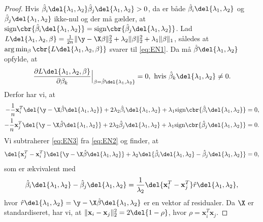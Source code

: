 \begin{proof}
Hvis \(\hat{\beta}_i \del{\lambda_1, \lambda_2} \hat{\beta}_j \del{\lambda_1, \lambda_2} > 0\), da er både \(\hat{\beta}_i \del{\lambda_1, \lambda_2}\) og \(\hat{\beta}_j \del{\lambda_1, \lambda_2}\) ikke-nul og der må gælder, at \(\text{sign} \cbr{\hat{\beta}_i \del{\lambda_1, \lambda_2}} = \text{sign} \cbr{\hat{\beta}_j \del{\lambda_1, \lambda_2}}\).
Lad \(L \del{\lambda_1,\lambda_2, \beta} = \frac{1}{2n} \Vert \y - \X \beta \Vert_2^2 + \lambda_2 \Vert \beta \Vert_2^2 + \lambda_1 \Vert \beta \Vert_1\), således at  \(\arg \min_{\beta} \cbr{L \del{\lambda_1,\lambda_2, \beta}}\) svarer til \eqref{eq:EN1}.
Da må \(\hat{\beta} \del{\lambda_1, \lambda_2}\) opfylde, at
\begin{align*}
\frac{\partial L \del{\lambda_1,\lambda_2, \beta} }{\partial \beta_k} \Bigr|_{\beta = \hat{\beta} \del{\lambda_1, \lambda_2}}=0, \text{ hvis } \hat{\beta}_k \del{\lambda_1, \lambda_2} \neq 0.
\end{align*}
Derfor har vi, at
\begin{align}
-\frac{1}{n} \mathbf{x}_i^T \del{\y - \X \hat{\beta} \del{\lambda_1, \lambda_2}} +  2 \lambda_2 \hat{\beta}_i \del{\lambda_1, \lambda_2} + \lambda_1 \text{sign} \cbr{\hat{\beta}_i \del{\lambda_1, \lambda_2}} &= 0, \label{eq:EN2}\\
-\frac{1}{n} \mathbf{x}_j^T \del{\y - \X \hat{\beta} \del{\lambda_1, \lambda_2}} + 2 \lambda_2 \hat{\beta}_j \del{\lambda_1, \lambda_2} + \lambda_1 \text{sign} \cbr{\hat{\beta}_j \del{\lambda_1, \lambda_2}} &= 0. \label{eq:EN3}
\end{align}
Vi subtraherer \eqref{eq:EN3} fra \eqref{eq:EN2} og finder, at
\begin{align*}
\del{\mathbf{x}_j^T-\mathbf{x}_i^T} \del{\y - \X \hat{\beta} \del{\lambda_1, \lambda_2}} + \lambda_2 \del{\hat{\beta}_i \del{\lambda_1, \lambda_2} - \hat{\beta}_j \del{\lambda_1, \lambda_2}} =0,
\end{align*}
som er ækvivalent med
\begin{align}
\hat{\beta}_i \del{\lambda_1, \lambda_2} - \hat{\beta}_j \del{\lambda_1, \lambda_2} = \frac{1}{\lambda_2} \del{\mathbf{x}_i^T-\mathbf{x}_j^T} \hat{r}\del{\lambda_1, \lambda_2}, \label{eq:EN4}
\end{align}
hvor \(\hat{r}\del{\lambda_1, \lambda_2} = \y - \X  \hat{\beta} \del{\lambda_1, \lambda_2}\) er en vektor af residualer.
Da \(\X\) er standardiseret, har vi, at \(\Vert \mathbf{x}_i - \mathbf{x}_j \Vert_2^2=2 \del{1-\rho}\), hvor \(\rho = \mathbf{x}_i^T \mathbf{x}_j\).

\end{proof}
